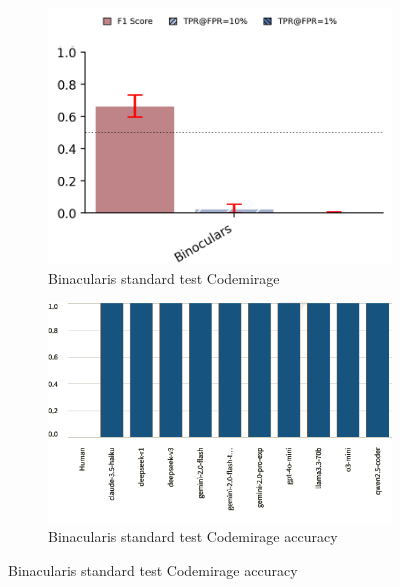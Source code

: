 \begin{figure}[H]
    \centering
    \begin{subfigure}[t]{0.4\textwidth}
        \centering
        \includegraphics[width=\linewidth]{img/TEST/Binacularis_standard/UncoveringTest.png}
        \caption{Binacularis standard test Codemirage}
        \label{fig:b2gg}
    \end{subfigure}
    \hfill
    \begin{subfigure}[t]{0.4\textwidth}
        \centering
        \includegraphics[width=\linewidth]{img/TEST/Binacularis_standard/visualization(44).png}
        \caption{Binacularis standard test Codemirage accuracy}
        \label{fig:ab2gg}
    \end{subfigure}
\end{figure}


